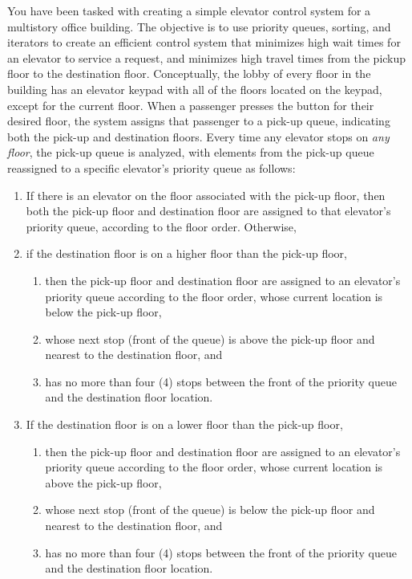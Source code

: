 \documentclass[10pt]{article}
\begin{document}
You have been tasked with creating a simple elevator control system for a multistory office building. The objective is to use priority queues, sorting, and iterators to create an efficient control system that minimizes high wait times for an elevator to service a request, and minimizes high travel times from the pickup floor to the destination floor. Conceptually, the lobby of every floor in the building has an elevator keypad with all of the floors located on the keypad, except for the current floor. When a passenger presses the button for their desired floor, the system assigns that passenger to a pick-up queue, indicating both the pick-up and destination floors. Every time any elevator stops on \emph{any floor}, the pick-up queue is analyzed, with elements from the pick-up queue reassigned to a specific elevator's priority queue as follows:
\begin{enumerate}
	\item If there is an elevator on the floor associated with the pick-up floor, then both the pick-up floor and destination floor are assigned to that elevator's priority queue, according to the floor order. Otherwise, 
	\item if the destination floor is on a higher floor than the pick-up floor,
	\begin{enumerate} 
		\item then the pick-up floor and destination floor are assigned to an elevator's priority queue according to the floor order, whose current location is below the pick-up floor,
		\item whose next stop (front of the queue) is above the pick-up floor and nearest to the destination floor, and
		\item has no more than four (4) stops between the front of the priority queue and the destination floor location.
	\end{enumerate}
	\item If the destination floor is on a lower floor than the pick-up floor, 
	\begin{enumerate} 
		\item then the pick-up floor and destination floor are assigned to an elevator's priority queue according to the floor order, whose current location is above the pick-up floor,
		\item whose next stop (front of the queue) is below the pick-up floor and nearest to the destination floor, and
		\item has no more than four (4) stops between the front of the priority queue and the destination floor location.
	\end{enumerate}	
\end{enumerate}
\end{document}
